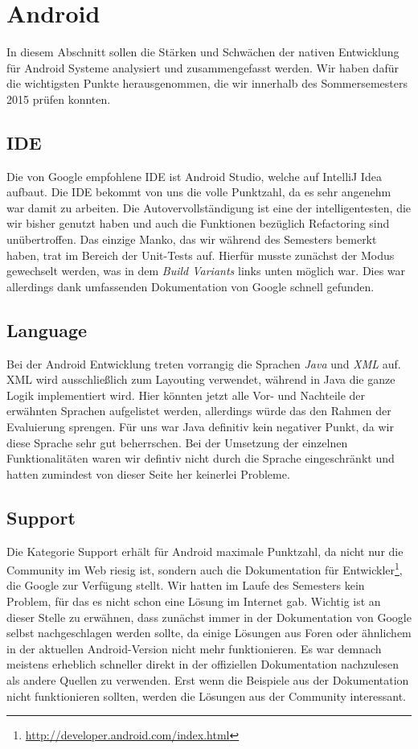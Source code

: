 \section{Android}
In diesem Abschnitt sollen die Stärken und Schwächen der nativen Entwicklung für Android Systeme analysiert und zusammengefasst werden. Wir haben dafür die wichtigsten Punkte herausgenommen, die wir innerhalb des Sommersemesters 2015 prüfen konnten.

\subsection{IDE}
Die von Google empfohlene IDE ist Android Studio, welche auf IntelliJ Idea aufbaut. Die IDE bekommt von uns die volle Punktzahl, da es sehr angenehm war damit zu arbeiten. Die Autovervollständigung ist eine der intelligentesten, die wir bisher genutzt haben und auch die Funktionen bezüglich Refactoring sind unübertroffen. Das einzige Manko, das wir während des Semesters bemerkt haben, trat im Bereich der Unit-Tests auf. Hierfür musste zunächst der Modus gewechselt werden, was in dem \textit{Build Variants} links unten möglich war. Dies war allerdings dank umfassenden Dokumentation von Google schnell gefunden.

\subsection{Language}
Bei der Android Entwicklung treten vorrangig die Sprachen \textit{Java} und \textit{XML} auf. XML wird ausschließlich zum Layouting verwendet, während in Java die ganze Logik implementiert wird. Hier könnten jetzt alle Vor- und Nachteile der erwähnten Sprachen aufgelistet werden, allerdings würde das den Rahmen der Evaluierung sprengen. Für uns war Java definitiv kein negativer Punkt, da wir diese Sprache sehr gut beherrschen. Bei der Umsetzung der einzelnen Funktionalitäten waren wir defintiv nicht durch die Sprache ein\-ge\-schränkt und hatten zumindest von dieser Seite her keinerlei Probleme.

\subsection{Support}
Die Kategorie Support erhält für Android maximale Punkt\-zahl, da nicht nur die Community im Web riesig ist, sondern auch die Dokumentation für Entwickler\footnote{\url{http://developer.android.com/index.html}}, die Google zur Verfügung stellt. Wir hatten im Laufe des Semesters kein Problem, für das es nicht schon eine Lösung im Internet gab. Wichtig ist an dieser Stelle zu erwähnen, dass zunächst immer in der Dokumentation von Google selbst nachgeschlagen werden sollte, da einige Lösungen aus Foren oder ähnlichem in der aktuellen Android-Version nicht mehr funktionieren. Es war demnach meistens erheblich schneller direkt in der offiziellen Dokumentation nachzulesen als andere Quellen zu verwenden. Erst wenn die Beispiele aus der Dokumentation nicht funktionieren sollten, werden die Lösungen aus der Community interessant.

